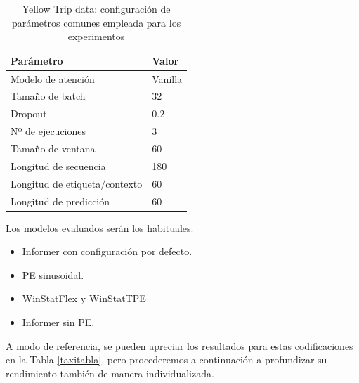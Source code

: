 \begin{table}[!ht]
	\centering
	\begin{tabular}{l|l}
		\toprule
		Parámetro & Valor \\
		\midrule
		{Modelo de atención} & Vanilla \\
		{Tamaño de batch} & 32 \\
		{Dropout} & 0.2 \\
		{Nº de ejecuciones} & 3 \\
		{Tamaño de ventana} & 60 \\
		{Longitud de secuencia} & 180 \\
		{Longitud de etiqueta/contexto} & 60 \\
		{Longitud de predicción} & 60 \\
		\bottomrule
	\end{tabular}
	\caption{Yellow Trip data: configuración de parámetros comunes empleada para los experimentos}
	\label{ajustestaxi}
\end{table}

Los modelos evaluados serán los habituales: 

\begin{itemize}
	\item Informer con configuración por defecto.
	\item PE sinusoidal.
	\item WinStatFlex y WinStatTPE
	\item Informer sin PE.
\end{itemize}

A modo de referencia, se pueden apreciar los resultados para estas codificaciones en la Tabla \ref{taxitabla}, pero procederemos a continuación a profundizar su rendimiento también de manera individualizada.




